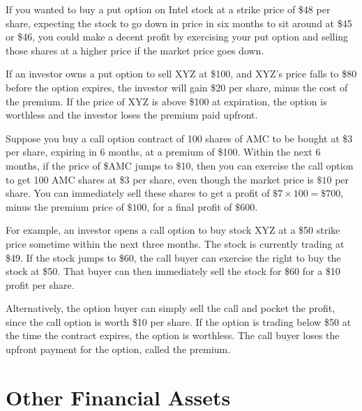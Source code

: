 \documentclass{article}
\begin{document}
  \begin{example}
    If you wanted to buy a put option on Intel stock at a strike price of \$48 per share, expecting the stock to go down in price in six months to sit around at \$45 or \$46, you could make a decent profit by exercising your put option and selling those shares at a higher price if the market price goes down. 
  \end{example}

  \begin{example}
    If an investor owns a put option to sell XYZ at \$100, and XYZ’s price falls to \$80 before the option expires, the investor will gain \$20 per share, minus the cost of the premium. If the price of XYZ is above \$100 at expiration, the option is worthless and the investor loses the premium paid upfront.
  \end{example}

  \begin{example}
    Suppose you buy a call option contract of 100 shares of AMC to be bought at \$3 per share, expiring in 6 months, at a premium of \$100. Within the next 6 months, if the price of \$AMC jumps to \$10, then you can exercise the call option to get 100 AMC shares at \$3 per share, even though the market price is $\$10$ per share. You can immediately sell these shares to get a profit of $\$7 \times 100 = \$700$, minus the premium price of $\$100$, for a final profit of $\$600$. 
  \end{example}

  \begin{example}
    For example, an investor opens a call option to buy stock XYZ at a \$50 strike price sometime within the next three months. The stock is currently trading at \$49. If the stock jumps to \$60, the call buyer can exercise the right to buy the stock at \$50. That buyer can then immediately sell the stock for \$60 for a \$10 profit per share. 
        
    Alternatively, the option buyer can simply sell the call and pocket the profit, since the call option is worth \$10 per share. If the option is trading below \$50 at the time the contract expires, the option is worthless. The call buyer loses the upfront payment for the option, called the premium.
  \end{example}

\section{Other Financial Assets}
\end{document}
